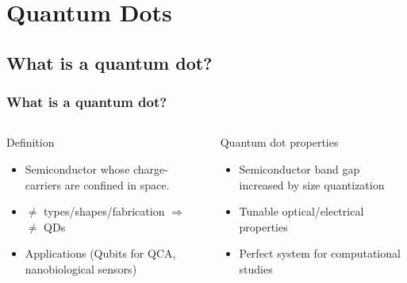 \documentclass[xcolor=pdftex,hyperref={pdfpagelabels=false},table]{beamer}
\begin{document}
\section{Quantum Dots}
\subsection{What is a quantum dot?}
\begin{frame}
\frametitle{What is a quantum dot?}
\begin{columns}[T,c]
\column{5cm}
\scriptsize
\begin{block}{Definition}
\begin{itemize}
\item Semiconductor whose charge-carriers are confined in space.
\item $\neq$ types/shapes/fabrication \newline $\Rightarrow$ $\neq$ QDs
\item Applications (Qubits for QCA, nanobiological sensors)
\end{itemize}
  \end{block}

\begin{block}{Quantum dot properties}
\begin{itemize}
\item Semiconductor band gap increased by size quantization
\item Tunable optical/electrical properties
\item Perfect system for computational studies
\end{itemize}
  \end{block}
\column{6cm}


\end{columns}
\end{frame}
\end{document}

